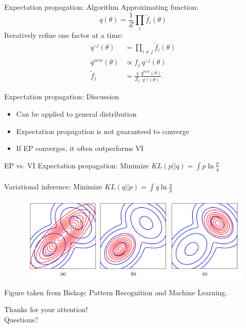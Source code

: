 \documentclass{beamer}
\begin{document}
\begin{frame}{Expectation propagation: Algorithm}
	Approximating function:
	\begin{equation*}
	q(\theta) = \frac{1}{Z}\prod_i \tilde{f}_i(\theta)
	\end{equation*}
	Iteratively refine one factor at a time:
	\begin{equation*}
	\begin{split}
	q^{\backslash j}(\theta) &= \prod_{i\ne j} \tilde{f}_i(\theta)\\
	q^{new}(\theta) & \propto f_j ~ q^{\backslash j}(\theta)\\
	\tilde{f}_j &= \frac{1}{Z_j} \frac{q^{new}(\theta)}{q^{\backslash j}(\theta)}
	\end{split}
	\end{equation*}

\end{frame}

\begin{frame}{Expectation propagation: Discussion}
	\begin{itemize}
		\item Can be applied to general distribution
		\item Expectation propagation is not guaranteed to converge
		\item If EP converges, it often outperforms VI
	\end{itemize}

\end{frame}

\begin{frame}{EP vs. VI}
	Expectation propagation: Minimize $KL(p||q) = \int p \ln \frac{p}{q}$\\
	~\\
	Variational inference: Minimize $KL(q||p)  = \int q \ln \frac{q}{p}$
	\begin{figure}[h]
		\begin{center}
			\includegraphics[scale=0.15]{../multimodal_approximation.png}
		\end{center}
	\end{figure}
	\small{Figure taken from Bishop: Pattern Recognition and Machine Learning.}
	
\end{frame}

\begin{frame}{}
	\centering
    Thanks for your attention!\\
    Questions?
\end{frame}
\end{document}
